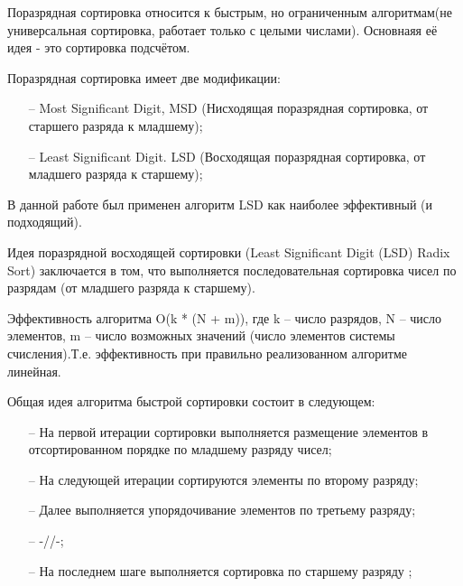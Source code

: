 \documentclass[a4paper,final]{report}
\begin{document}
\begin{spacing}{1.5}
		\par Поразрядная сортировка относится к быстрым, но ограниченным алгоритмам(не универсальная сортировка, работает только с целыми числами). Основнаяя её идея - это сортировка подсчётом.
		\par Поразрядная сортировка имеет две модификации: 
		\begin{itemize} 
			\item[--] Most Significant Digit, MSD (Нисходящая поразрядная сортировка, от старшего разряда к младшему); 
			\item[--] Least Significant Digit. LSD (Восходящая поразрядная сортировка, от младшего разряда к старшему); 
		\end{itemize}
		В данной работе был применен алгоритм LSD как наиболее эффективный (и подходящий). 
		\par Идея поразрядной восходящей сортировки (Least Significant Digit (LSD) Radix Sort) заключается в том, что выполняется последовательная сортировка чисел по разрядам (от младшего разряда к старшему).
		\par Эффективность алгоритма O(k * (N + m)), где k – число разрядов, N – число элементов, m – число возможных значений (число элементов системы счисления).Т.е. эффективность при правильно реализованном алгоритме линейная.
		\par Общая идея алгоритма быстрой сортировки состоит в следующем: 
		\begin{itemize} 
			\item[--] На первой итерации сортировки выполняется размещение элементов в отсортированном порядке по младшему разряду чисел;
			\item[--] На следующей итерации сортируются элементы по второму разряду;
			\item[--] Далее выполняется упорядочивание элементов по третьему разряду;
			\item[--] -//-;
			\item[--] На последнем шаге выполняется сортировка по старшему разряду ;
		\end{itemize}
		

\end{spacing}
\end{document}
